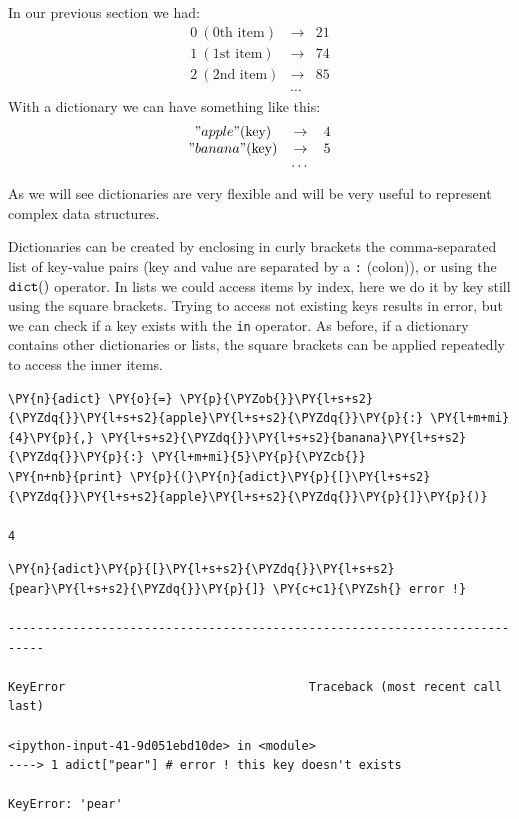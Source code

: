 In our previous section we had:
\[
\begin{matrix} 
0~(\textrm{0th item})& \rightarrow& 21\\
1~(\textrm{1st item})& \rightarrow& 74\\
2~(\textrm{2nd item})& \rightarrow& 85\\ 
&\cdots&  
\end{matrix}
\]
With a dictionary we can have something like this:
\[
\begin{matrix}
"apple" (\textrm{key})&\rightarrow& 4 \\
"banana" (\textrm{key})& \rightarrow& 5 \\
&\cdots&
\end{matrix}
\]
As we will see dictionaries are very flexible and will be very useful to represent complex data structures.

Dictionaries can be created by enclosing in curly brackets the comma-separated list of key-value pairs 
(key and value are separated by a \texttt{:} (colon)), or using the $\tt{dict()}$ operator.
In lists we could access items by index, here we do it by key still using the square brackets. 
Trying to access not existing keys results in error, but we can check if a key exists with the 
\texttt{in} operator.
As before, if a dictionary contains other dictionaries or lists, the square brackets can be applied 
repeatedly to access the inner items.

\begin{codebox}[breakable, size=fbox, boxrule=1pt, pad at break*=1mm, colback=cellbackground, colframe=cellborder]
\begin{Verbatim}[commandchars=\\\{\}]
\PY{n}{adict} \PY{o}{=} \PY{p}{\PYZob{}}\PY{l+s+s2}{\PYZdq{}}\PY{l+s+s2}{apple}\PY{l+s+s2}{\PYZdq{}}\PY{p}{:} \PY{l+m+mi}{4}\PY{p}{,} \PY{l+s+s2}{\PYZdq{}}\PY{l+s+s2}{banana}\PY{l+s+s2}{\PYZdq{}}\PY{p}{:} \PY{l+m+mi}{5}\PY{p}{\PYZcb{}}
\PY{n+nb}{print} \PY{p}{(}\PY{n}{adict}\PY{p}{[}\PY{l+s+s2}{\PYZdq{}}\PY{l+s+s2}{apple}\PY{l+s+s2}{\PYZdq{}}\PY{p}{]}\PY{p}{)}

4
\end{Verbatim}
\end{codebox}

\begin{codebox}[breakable, size=fbox, boxrule=1pt, pad at break*=1mm, colback=cellbackground, colframe=cellborder]
\begin{Verbatim}[commandchars=\\\{\}]
\PY{n}{adict}\PY{p}{[}\PY{l+s+s2}{\PYZdq{}}\PY{l+s+s2}{pear}\PY{l+s+s2}{\PYZdq{}}\PY{p}{]} \PY{c+c1}{\PYZsh{} error !}

---------------------------------------------------------------------------

KeyError                                  Traceback (most recent call last)

<ipython-input-41-9d051ebd10de> in <module>
----> 1 adict["pear"] # error ! this key doesn't exists
    
KeyError: 'pear'
\end{Verbatim}
\end{codebox}

